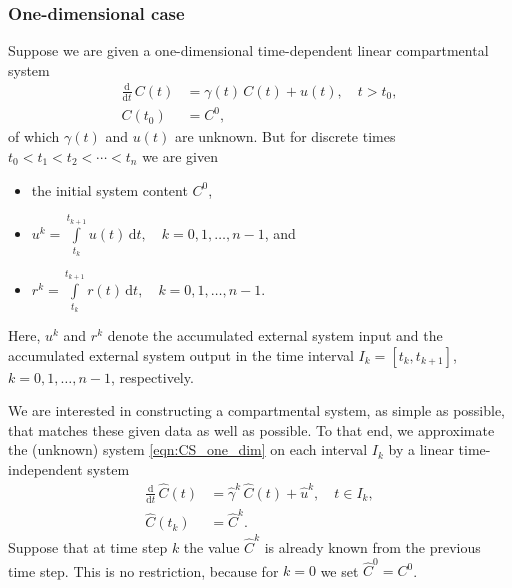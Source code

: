 \documentclass[11pt,a4paper]{article}
\newcommand{\deriv}[1]{\frac{\mathrm{d}}{\mathrm{d}#1}}
\newcommand{\dd}[1]{\,\mathrm{d}#1}
\newcommand{\intl}{\int\limits}
\begin{document}
    \subsubsection*{One-dimensional case}
        Suppose we are given a one-dimensional   time-dependent linear compartmental system
        \begin{equation}\label{eqn:CS_one_dim}
            \begin{aligned}
                \deriv{t}\,C(t) &= \gamma(t)\,C(t) + u(t),\quad t>t_0,\\
                C(t_0) &= C^0,
            \end{aligned}
        \end{equation}
        of which $\gamma(t)$ and $u(t)$ are unknown.
        But for discrete times $t_0<t_1<t_2<\cdots<t_n$ we are given
        \begin{itemize}
            \item the initial system content $C^0$,
            \item $u^k = \intl_{t_k}^{t_{k+1}} u(t)\dd{t},\quad k=0,1,\ldots,n-1$, and
            \item $r^k = \intl_{t_k}^{t_{k+1}} r(t)\dd{t},\quad k=0,1,\ldots,n-1$.
        \end{itemize}
        Here, $u^k$ and $r^k$ denote the accumulated external system input and the accumulated external system output in the time interval $I_k=[t_k,t_{k+1}]$, $k=0,1,\ldots,n-1$, respectively.

        We are interested in constructing a compartmental system, as simple as possible, that matches these given data as well as possible.
        To that end, we approximate the (unknown) system \eqref{eqn:CS_one_dim} on each interval $I_k$ by a linear time-independent system
        \begin{equation}\label{eqn:CS_one_dim_approx}
            \begin{aligned}
                \deriv{t}\,\widehat{C}(t) &= \widehat{\gamma}^k\,\widehat{C}(t) + \widehat{u}^k,\quad t\in I_k,\\
                \widehat{C}(t_k) &= \widehat{C}^k.
            \end{aligned}
        \end{equation}
        Suppose that at time step $k$ the value $\widehat{C}^k$ is already known from the previous time step.
        This is no restriction, because for $k=0$ we set $\widehat{C}^0=C^0$.
        
\end{document}
